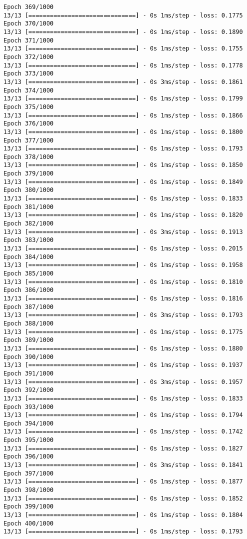 \documentclass[11pt]{article}
\begin{document}
\begin{Verbatim}[commandchars=\\\{\}]
Epoch 369/1000
13/13 [==============================] - 0s 1ms/step - loss: 0.1775
Epoch 370/1000
13/13 [==============================] - 0s 1ms/step - loss: 0.1890
Epoch 371/1000
13/13 [==============================] - 0s 1ms/step - loss: 0.1755
Epoch 372/1000
13/13 [==============================] - 0s 1ms/step - loss: 0.1778
Epoch 373/1000
13/13 [==============================] - 0s 3ms/step - loss: 0.1861
Epoch 374/1000
13/13 [==============================] - 0s 1ms/step - loss: 0.1799
Epoch 375/1000
13/13 [==============================] - 0s 1ms/step - loss: 0.1866
Epoch 376/1000
13/13 [==============================] - 0s 1ms/step - loss: 0.1800
Epoch 377/1000
13/13 [==============================] - 0s 1ms/step - loss: 0.1793
Epoch 378/1000
13/13 [==============================] - 0s 1ms/step - loss: 0.1850
Epoch 379/1000
13/13 [==============================] - 0s 1ms/step - loss: 0.1849
Epoch 380/1000
13/13 [==============================] - 0s 1ms/step - loss: 0.1833
Epoch 381/1000
13/13 [==============================] - 0s 1ms/step - loss: 0.1820
Epoch 382/1000
13/13 [==============================] - 0s 3ms/step - loss: 0.1913
Epoch 383/1000
13/13 [==============================] - 0s 1ms/step - loss: 0.2015
Epoch 384/1000
13/13 [==============================] - 0s 1ms/step - loss: 0.1958
Epoch 385/1000
13/13 [==============================] - 0s 1ms/step - loss: 0.1810
Epoch 386/1000
13/13 [==============================] - 0s 1ms/step - loss: 0.1816
Epoch 387/1000
13/13 [==============================] - 0s 3ms/step - loss: 0.1793
Epoch 388/1000
13/13 [==============================] - 0s 1ms/step - loss: 0.1775
Epoch 389/1000
13/13 [==============================] - 0s 1ms/step - loss: 0.1880
Epoch 390/1000
13/13 [==============================] - 0s 1ms/step - loss: 0.1937
Epoch 391/1000
13/13 [==============================] - 0s 3ms/step - loss: 0.1957
Epoch 392/1000
13/13 [==============================] - 0s 1ms/step - loss: 0.1833
Epoch 393/1000
13/13 [==============================] - 0s 1ms/step - loss: 0.1794
Epoch 394/1000
13/13 [==============================] - 0s 1ms/step - loss: 0.1742
Epoch 395/1000
13/13 [==============================] - 0s 1ms/step - loss: 0.1827
Epoch 396/1000
13/13 [==============================] - 0s 3ms/step - loss: 0.1841
Epoch 397/1000
13/13 [==============================] - 0s 1ms/step - loss: 0.1877
Epoch 398/1000
13/13 [==============================] - 0s 1ms/step - loss: 0.1852
Epoch 399/1000
13/13 [==============================] - 0s 1ms/step - loss: 0.1804
Epoch 400/1000
13/13 [==============================] - 0s 1ms/step - loss: 0.1793

\end{Verbatim}
\end{document}
